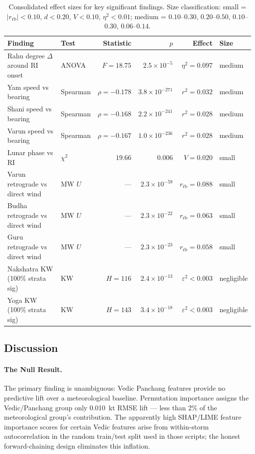 \documentclass[12pt,a4paper]{article}
\begin{document}
    \begin{table}[H]
    \centering
    \caption{Consolidated effect sizes for key significant findings.
    Size classification: small = $|r_{\text{rb}}| < 0.10$, $d < 0.20$,
    $V < 0.10$, $\eta^2 < 0.01$; medium = $0.10$--$0.30$, $0.20$--$0.50$,
    $0.10$--$0.30$, $0.06$--$0.14$.}
    \label{tab:effect_sizes}
    \small
    \begin{tabular}{p{5.5cm}lrrrl}
        \toprule
        \textbf{Finding} & \textbf{Test} & \textbf{Statistic} & \boldmath$p$ & \textbf{Effect} & \textbf{Size} \\
        \midrule
        Rahu degree $\Delta$ around RI onset & ANOVA & $F=18.75$ & $2.5\times10^{-5}$ & $\eta^2=0.097$ & medium \\
        Yam speed vs bearing & Spearman & $\rho=-0.178$ & $3.8\times10^{-271}$ & $r^2=0.032$ & medium \\
        Shani speed vs bearing & Spearman & $\rho=-0.168$ & $2.2\times10^{-241}$ & $r^2=0.028$ & medium \\
        Varun speed vs bearing & Spearman & $\rho=-0.167$ & $1.0\times10^{-236}$ & $r^2=0.028$ & medium \\
        Lunar phase vs RI & $\chi^2$ & $19.66$ & $0.006$ & $V=0.020$ & small \\
        Varun retrograde vs direct wind & MW $U$ & --- & $2.3\times10^{-59}$ & $r_\text{rb}=0.088$ & small \\
        Budha retrograde vs direct wind & MW $U$ & --- & $2.3\times10^{-22}$ & $r_\text{rb}=0.063$ & small \\
        Guru retrograde vs direct wind & MW $U$ & --- & $2.3\times10^{-23}$ & $r_\text{rb}=0.058$ & small \\
        Nakshatra KW (100\% strata sig) & KW & $H=116$ & $2.4\times10^{-13}$ & $\varepsilon^2 < 0.003$ & negligible \\
        Yoga KW (100\% strata sig) & KW & $H=143$ & $3.4\times10^{-18}$ & $\varepsilon^2 < 0.003$ & negligible \\
        \bottomrule
    \end{tabular}
    \end{table}

    \subsection{Discussion}

    \paragraph{The Null Result.}
    The primary finding is unambiguous: Vedic Panchang features provide no
    predictive lift over a meteorological baseline. Permutation importance assigns
    the Vedic/Panchang group only 0.010~kt RMSE lift --- less than 2\% of the
    meteorological group's contribution. The apparently high SHAP/LIME feature
    importance scores for certain Vedic features arise from within-storm
    autocorrelation in the random train/test split used in those scripts; the
    honest forward-chaining design eliminates this inflation.
\end{document}
